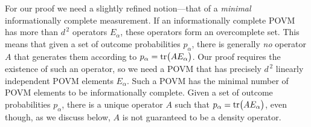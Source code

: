 For our proof we need a slightly refined notion---that of a {\it
minimal\/} informationally complete measurement.  If an
informationally complete POVM has more than $d^{\,2}$ operators
$E_\alpha$, these operators form an overcomplete set.  This means
that given a set of outcome probabilities $p_\alpha$, there is
generally {\it no\/} operator $A$ that generates them according to
$p_\alpha={\rm tr}\big(AE_\alpha\bigr)$.  Our proof requires the
existence of such an operator, so we need a POVM that has
precisely $d^{\,2}$ linearly independent POVM elements $E_\alpha$.
Such a POVM has the minimal number of POVM elements to be
informationally complete.  Given a set of outcome probabilities
$p_\alpha$, there is a unique operator $A$ such that
$p_\alpha={\rm tr}\big(AE_\alpha\bigr)$, even though, as we
discuss below, $A$ is not guaranteed to be a density operator.

